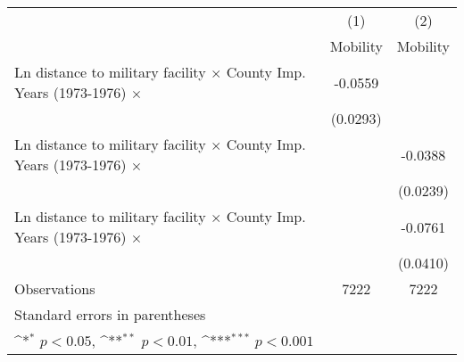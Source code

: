 {
\def\sym#1{\ifmmode^{#1}\else\(^{#1}\)\fi}
\begin{tabular}{l*{2}{c}}
\hline\hline
                    &\multicolumn{1}{c}{(1)}&\multicolumn{1}{c}{(2)}\\
                    &\multicolumn{1}{c}{Mobility}&\multicolumn{1}{c}{Mobility}\\
\hline
Ln distance to military facility $\times$ County Imp. Years (1973-1976) $\times$&     -0.0559         &                     \\
                    &    (0.0293)         &                     \\
[1em]
Ln distance to military facility $\times$ County Imp. Years (1973-1976) $\times$&                     &     -0.0388         \\
                    &                     &    (0.0239)         \\
[1em]
Ln distance to military facility $\times$ County Imp. Years (1973-1976) $\times$&                     &     -0.0761         \\
                    &                     &    (0.0410)         \\
\hline
Observations        &        7222         &        7222         \\
\hline\hline
\multicolumn{3}{l}{\footnotesize Standard errors in parentheses}\\
\multicolumn{3}{l}{\footnotesize \sym{*} \(p<0.05\), \sym{**} \(p<0.01\), \sym{***} \(p<0.001\)}\\
\end{tabular}
}
